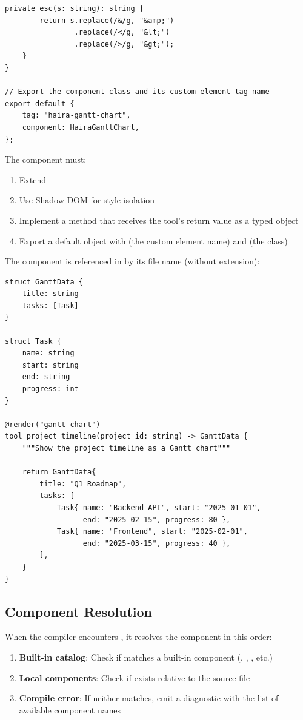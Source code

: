 \begin{lstlisting}[language={}]
    private esc(s: string): string {
        return s.replace(/&/g, "&amp;")
                .replace(/</g, "&lt;")
                .replace(/>/g, "&gt;");
    }
}

// Export the component class and its custom element tag name
export default {
    tag: "haira-gantt-chart",
    component: HairaGanttChart,
};
\end{lstlisting}

The component must:
\begin{enumerate}
    \item Extend 
    \item Use Shadow DOM for style isolation
    \item Implement a  method that receives the tool's return value as a typed object
    \item Export a default object with  (the custom element name) and  (the class)
\end{enumerate}

The component is referenced in  by its file name (without extension):

\begin{lstlisting}
struct GanttData {
    title: string
    tasks: [Task]
}

struct Task {
    name: string
    start: string
    end: string
    progress: int
}

@render("gantt-chart")
tool project_timeline(project_id: string) -> GanttData {
    """Show the project timeline as a Gantt chart"""

    return GanttData{
        title: "Q1 Roadmap",
        tasks: [
            Task{ name: "Backend API", start: "2025-01-01",
                  end: "2025-02-15", progress: 80 },
            Task{ name: "Frontend", start: "2025-02-01",
                  end: "2025-03-15", progress: 40 },
        ],
    }
}
\end{lstlisting}

\subsection{Component Resolution}

When the compiler encounters , it resolves the component in this order:

\begin{enumerate}
    \item \textbf{Built-in catalog}: Check if  matches a built-in component (, , , etc.)
    \item \textbf{Local components}: Check if  exists relative to the  source file
    \item \textbf{Compile error}: If neither matches, emit a diagnostic with the list of available component names
\end{enumerate}

